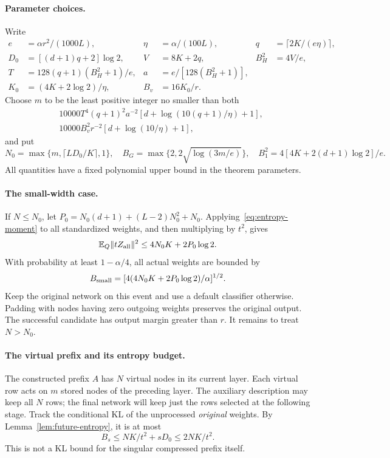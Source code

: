 \paragraph{Parameter choices.}
Write
\begin{align*}
 e&=\alpha r^2/(1000L),& \eta&=\alpha/(100L),&
 q&=\lceil2K/(e\eta)\rceil,\\
 D_0&=[(d+1)q+2]\log2,& V&=8K+2q,& B_H^2&=4V/e,\\
 T&=128(q+1)(B_H^2+1)/e,& a&=e/[128(B_H^2+1)],\\
 K_0&=(4K+2\log2)/\eta,& B_v&=16K_0/r.
\end{align*}
Choose $m$ to be the least positive integer no smaller than both
\begin{align*}
 &10000T^4(q+1)^2a^{-2}[d+\log(10(q+1)/\eta)+1],\\
 &10000B_v^2r^{-2}[d+\log(10/\eta)+1],
\end{align*}
and put
\[
 N_0=\max\{m,\lceil LD_0/K\rceil,1\},\quad
 B_G=\max\{2,2\sqrt{\log(3m/e)}\},\quad
 B_1^2=4[4K+2(d+1)\log2]/e.
\]
All quantities have a fixed polynomial upper bound in the theorem parameters.

\paragraph{The small-width case.}
If $N\le N_0$, let
$P_0=N_0(d+1)+(L-2)N_0^2+N_0$. Applying~\eqref{eq:entropy-moment} to all
standardized weights, and then multiplying by $t^2$, gives
\[
 \mathbb E_Q\|tZ_{\rm all}\|^2\le4N_0K+2P_0\log2.
\]
With probability at least $1-\alpha/4$, all actual weights are bounded by
\[
 B_{\rm small}=[4(4N_0K+2P_0\log2)/\alpha]^{1/2}.
\]
Keep the original network on this event and use a default classifier otherwise.
Padding with nodes having zero outgoing weights preserves the original output.
The successful candidate has output margin greater than $r$.
It remains to treat $N>N_0$.

\paragraph{The virtual prefix and its entropy budget.}
The constructed prefix $A$ has $N$ virtual nodes in its current layer. Each
virtual row acts on $m$ stored nodes of the preceding layer. The auxiliary
description may keep all $N$ rows; the final network will keep just the rows
selected at the following stage. Track the conditional KL of the unprocessed
\emph{original} weights. By Lemma~\ref{lem:future-entropy}, it is at most
\[
 B_s\le NK/t^2+sD_0\le2NK/t^2.                              \tag{*}
\]
This is not a KL bound for the singular compressed prefix itself.


